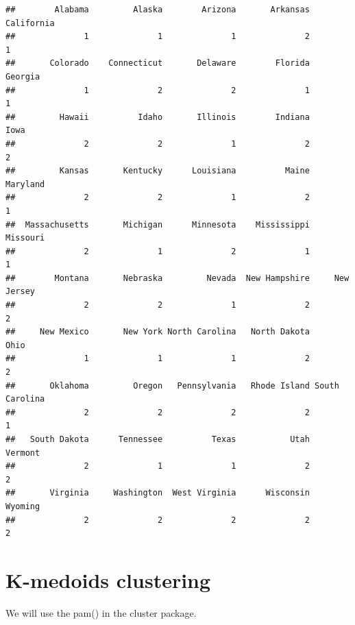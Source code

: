 \documentclass[
]{book}
\newenvironment{Shaded}{\begin{snugshade}}{\end{snugshade}}
\newcommand{\DecValTok}[1]{\textcolor[rgb]{0.00,0.00,0.81}{#1}}
\newcommand{\KeywordTok}[1]{\textcolor[rgb]{0.13,0.29,0.53}{\textbf{#1}}}
\newcommand{\NormalTok}[1]{#1}
\newcommand{\OperatorTok}[1]{\textcolor[rgb]{0.81,0.36,0.00}{\textbf{#1}}}
\newcommand{\StringTok}[1]{\textcolor[rgb]{0.31,0.60,0.02}{#1}}
\begin{document}
\begin{verbatim}
##        Alabama         Alaska        Arizona       Arkansas     California 
##              1              1              1              2              1 
##       Colorado    Connecticut       Delaware        Florida        Georgia 
##              1              2              2              1              1 
##         Hawaii          Idaho       Illinois        Indiana           Iowa 
##              2              2              1              2              2 
##         Kansas       Kentucky      Louisiana          Maine       Maryland 
##              2              2              1              2              1 
##  Massachusetts       Michigan      Minnesota    Mississippi       Missouri 
##              2              1              2              1              1 
##        Montana       Nebraska         Nevada  New Hampshire     New Jersey 
##              2              2              1              2              2 
##     New Mexico       New York North Carolina   North Dakota           Ohio 
##              1              1              1              2              2 
##       Oklahoma         Oregon   Pennsylvania   Rhode Island South Carolina 
##              2              2              2              2              1 
##   South Dakota      Tennessee          Texas           Utah        Vermont 
##              2              1              1              2              2 
##       Virginia     Washington  West Virginia      Wisconsin        Wyoming 
##              2              2              2              2              2
\end{verbatim}

\hypertarget{k-medoids-clustering}{%
\section{K-medoids clustering}\label{k-medoids-clustering}}

We will use the pam() in the cluster package.

\begin{Shaded}
\end{Shaded}
\end{document}
